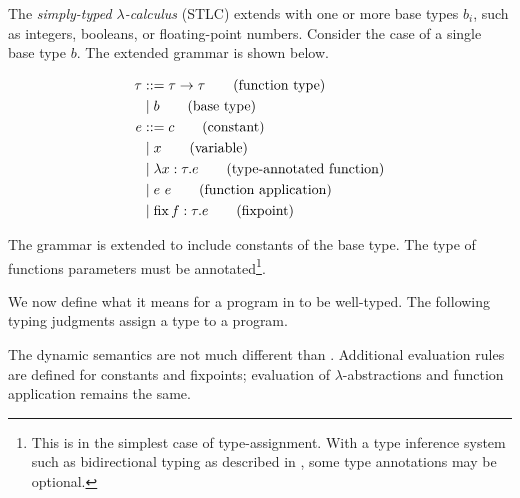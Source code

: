 The \textit{simply-typed $\lambda$-calculus} (STLC) \stlc{} extends \ulc{} with one or more base types $b_i$, such as integers, booleans, or floating-point numbers. Consider the case of a single base type $b$. The extended grammar is shown below.

\begin{singlespace}
  \begin{align*}
    \tau &::=\tau\to\tau\tag{function type} \\
         &\mid b\tag{base type} \\
    e &::= c\tag{constant} \\
         &\mid x\tag{variable} \\
         &\mid\lambda x:\tau.e\tag{type-annotated function} \\
         &\mid e\ e\tag{function application} \\
         &\mid \operatorname{fix} f:\tau.e\tag{fixpoint}
  \end{align*}
\end{singlespace}

The grammar is extended to include constants of the base type. The type of functions parameters must be annotated\footnote{This is in the simplest case of type-assignment. With a type inference system such as bidirectional typing as described in , some type annotations may be optional.}.

We now define what it means for a program in \stlc{} to be well-typed. The following typing judgments assign a type to a \stlc{} program.

\begin{singlespace}
\end{singlespace}

The dynamic semantics are not much different than \ulc{}. Additional evaluation rules are defined for constants and fixpoints; evaluation of $\lambda$-abstractions and function application remains the same.

